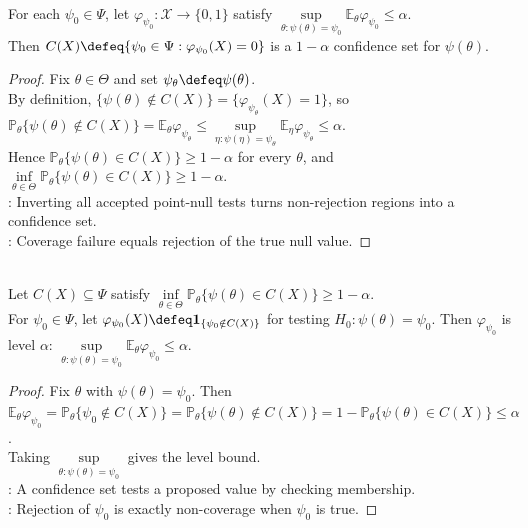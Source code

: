 \begin{proposition} \label{prop:test-confidence-duality} \\
For each $\psi_0\in\Psi$, let $\varphi_{\psi_0}:\mathcal{X}\to\{0,1\}$ satisfy $\sup\limits_{\theta:\psi(\theta)=\psi_0}\mathbb{E}_\theta\varphi_{\psi_0}\leq\alpha$.\\
Then $C(X)\defeq\{\psi_0\in\Psi:\varphi_{\psi_0}(X)=0\}$ is a $1-\alpha$ confidence set for $\psi(\theta)$.
\begin{proof}
Fix $\theta\in\Theta$ and set $\psi_\theta\defeq\psi(\theta)$.\\
By definition, $\{\psi(\theta)\notin C(X)\}=\{\varphi_{\psi_\theta}(X)=1\}$, so $\mathbb{P}_\theta\{\psi(\theta)\notin C(X)\}=\mathbb{E}_\theta\varphi_{\psi_\theta}\leq\sup\limits_{\eta:\psi(\eta)=\psi_\theta}\mathbb{E}_\eta\varphi_{\psi_\theta}\leq\alpha$.\\
Hence $\mathbb{P}_\theta\{\psi(\theta)\in C(X)\}\geq1-\alpha$ for every $\theta$, and $\inf\limits_{\theta\in\Theta}\mathbb{P}_\theta\{\psi(\theta)\in C(X)\}\geq1-\alpha$.\\
: Inverting all accepted point-null tests turns non-rejection regions into a confidence set.\\
: Coverage failure equals rejection of the true null value.
\end{proof}
\end{proposition}

\begin{proposition} \label{prop:confidence-test-converse-duality} \\
Let $C(X)\subseteq\Psi$ satisfy $\inf\limits_{\theta\in\Theta}\mathbb{P}_\theta\{\psi(\theta)\in C(X)\}\geq1-\alpha$.\\
For $\psi_0\in\Psi$, let $\varphi_{\psi_0}(X)\defeq\mathbf{1}_{\{\psi_0\notin C(X)\}}$ for testing $H_0:\psi(\theta)=\psi_0$. Then $\varphi_{\psi_0}$ is level $\alpha$: $\sup\limits_{\theta:\psi(\theta)=\psi_0}\mathbb{E}_\theta\varphi_{\psi_0}\leq\alpha$.
\begin{proof} Fix $\theta$ with $\psi(\theta)=\psi_0$. Then $\mathbb{E}_\theta\varphi_{\psi_0}=\mathbb{P}_\theta\{\psi_0\notin C(X)\}=\mathbb{P}_\theta\{\psi(\theta)\notin C(X)\}=1-\mathbb{P}_\theta\{\psi(\theta)\in C(X)\}\leq\alpha$.\\
Taking $\sup\limits_{\theta:\psi(\theta)=\psi_0}$ gives the level bound.\\
: A confidence set tests a proposed value by checking membership.\\
: Rejection of $\psi_0$ is exactly non-coverage when $\psi_0$ is true.
\end{proof}
\end{proposition}

